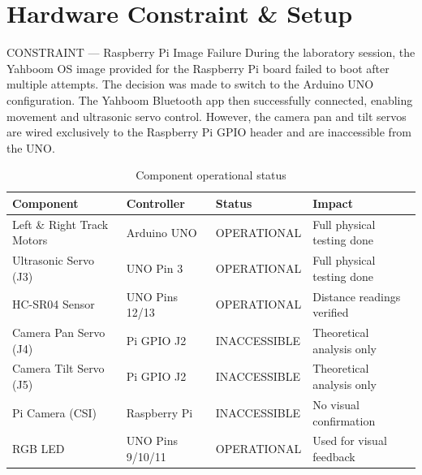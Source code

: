 \documentclass[12pt,a4paper]{article}
\begin{document}
\section{Hardware Constraint \& Setup}

\begin{dangerbox}{CONSTRAINT --- Raspberry Pi Image Failure}
During the laboratory session, the Yahboom OS image provided for the Raspberry Pi
board failed to boot after multiple attempts. The decision was made to switch to
the Arduino UNO configuration. The Yahboom Bluetooth app then successfully
connected, enabling movement and ultrasonic servo control. However, the camera
pan and tilt servos are wired exclusively to the Raspberry Pi GPIO header and
are inaccessible from the UNO.
\end{dangerbox}

\vspace{6pt}
\begin{table}[h!]
\centering
\caption{Component operational status}
\renewcommand{\arraystretch}{1.3}
\begin{tabularx}{\linewidth}{L{3.5cm} L{2.8cm} C{3cm} X}
\toprule
{}
\color{white}\textbf{Component} &
\color{white}\textbf{Controller} &
\color{white}\textbf{Status} &
\color{white}\textbf{Impact} \\
\midrule
Left \& Right Track Motors & Arduino UNO & \color{SuccessGreen}OPERATIONAL & Full physical testing done \\
Ultrasonic Servo (J3) & UNO Pin 3 & \color{SuccessGreen}OPERATIONAL & Full physical testing done \\
HC-SR04 Sensor & UNO Pins 12/13 & \color{SuccessGreen}OPERATIONAL & Distance readings verified \\
Camera Pan Servo (J4) & Pi GPIO J2 & \color{DangerRed}INACCESSIBLE & Theoretical analysis only \\
Camera Tilt Servo (J5) & Pi GPIO J2 & \color{DangerRed}INACCESSIBLE & Theoretical analysis only \\
Pi Camera (CSI) & Raspberry Pi & \color{DangerRed}INACCESSIBLE & No visual confirmation \\
RGB LED & UNO Pins 9/10/11 & \color{SuccessGreen}OPERATIONAL & Used for visual feedback \\
\bottomrule
\end{tabularx}
\end{table}
\end{document}
